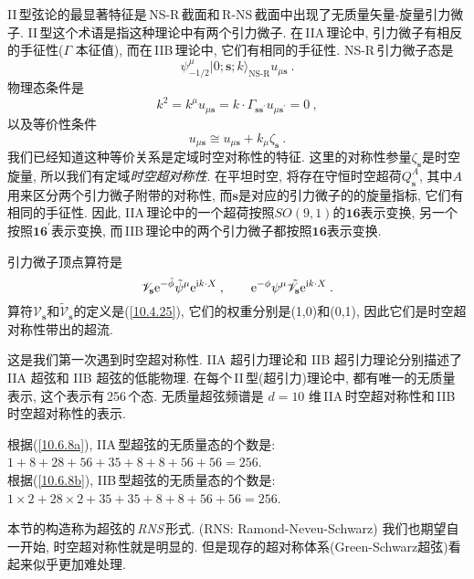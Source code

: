 II\,型弦论的最显著特征是\,NS-R\,截面和\,R-NS\,截面中出现了无质量矢量-旋量引力微子. II\,型这个术语是指这种理论中有两个引力微子. 在\,IIA\,理论中, 引力微子有相反的手征性($\Gamma$ 本征值), 而在\,IIB\,理论中, 它们有相同的手征性. NS-R\,引力微子态是
\begin{equation}
    \psi_{-1/2}^{\mu}\lvert 0;\mathbf{s};k\rangle_{\text{NS-R}} u_{\mu\mathbf{s}} \:. \label{10.6.12}
\end{equation}
物理态条件是
\begin{equation}
    k^{2}=k^{\mu}u_{\mu\mathbf{s}}=k\cdot \Gamma_{\mathbf{s}\mathbf{s}^{\prime}}u_{\mu\mathbf{s}^{\prime}}=0\:,\label{10.6.13}
\end{equation}
以及等价性条件
\begin{equation}
    u_{\mu\mathbf{s}} \cong u_{\mu\mathbf{s}} + k_{\mu}\zeta_{\mathbf{s}} \:. \label{10.6.14}
\end{equation}
我们已经知道这种等价关系是定域时空对称性的特征. 这里的对称性参量$ \zeta_{\mathbf{s}} $是时空旋量, 所以我们有定域{\emph{时空超对称性}}. 在平坦时空, 将存在守恒时空超荷$ Q_{\mathbf{s}}^{A}$, 其中$ A $用来区分两个引力微子附带的对称性, 而$ \mathbf{s} $是对应的引力微子的的旋量指标, 它们有相同的手征性. 因此, IIA\,理论中的一个超荷按照$ SO(9,1) $的$ \mathbf{16} $表示变换, 另一个按照$ \mathbf{16}^{\prime} $表示变换, 而\,IIB\,理论中的两个引力微子都按照$ \mathbf{16} $表示变换.

引力微子顶点算符是
\begin{equation}
    \mathscr{V}_{\mathbf{s}}\mathrm{e}^{-\tilde{\phi}}\tilde{\psi}^{\mu}\mathrm{e}^{\mathrm{i} k\cdot X} \:, \qquad
    \mathrm{e}^{-\phi}\psi^{\mu} \tilde{\mathscr{V}}_{\mathbf{s}}\mathrm{e}^{\mathrm{i} k\cdot X} \:. \label{10.6.15}
\end{equation}
算符$ \mathscr{V}_{\mathbf{s}} $和$ \tilde{\mathscr{V}}_{\mathbf{s}} $的定义是(\ref{10.4.25}), 它们的权重分别是(1,0)和(0,1), 因此它们是时空超对称性带出的超流.

这是我们第一次遇到时空超对称性. IIA 超引力理论和 IIB 超引力理论分别描述了 IIA 超弦和 IIB 超弦的低能物理. 在每个\,II\,型(超引力)理论中, 都有唯一的无质量表示, 这个表示有\,256\,个态. 无质量超弦频谱是 $d=10$ 维\,IIA\,时空超对称性和\,IIB\,时空超对称性的表示.
\begin{tcolorbox}
根据(\ref{10.6.8a}), IIA\,型超弦的无质量态的个数是: $1+8+28+56+35+8+8+56+56=256$.\\
根据(\ref{10.6.8b}), IIB\,型超弦的无质量态的个数是: $1\times2+28\times 2+35+35+8+8+56+56=256$.
\end{tcolorbox}

本节的构造称为超弦的\,\emph{RNS}\,形式. (RNS: Ramond-Neveu-Schwarz) 我们也期望自一开始, 时空超对称性就是明显的. 但是现存的超对称体系(Green-Schwarz超弦)看起来似乎更加难处理.

